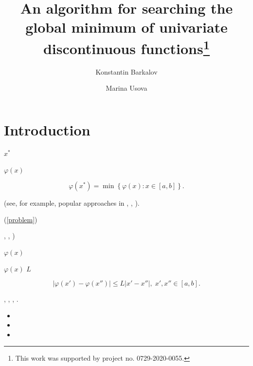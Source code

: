 \documentclass[runningheads]{llncs}
\begin{document}
%
\title{An algorithm for searching the global minimum of univariate discontinuous functions\thanks{This work was supported by project no. 0729-2020-0055.}}
%
%
\author{Konstantin Barkalov %
\and Marina Usova %
}
%
%
%
\maketitle              %
%
\begin{abstract}


\end{abstract}
%
%
%
\section{Introduction}

$x^*$

$\varphi(x)$

\begin{equation}\label{problem}
\varphi(x^*)=\min\left\{\varphi(x):x\in\left[a,b\right]\right\}.
\end{equation}

(see, for example, popular approaches in \cite{Sergeyev2013}, \cite{PaulaviciusZilinskas2014}, \cite{Sergeyev2017}).

(\ref{problem})

\cite{Horst1995}, \cite{Horst1996}, \cite{Pinter1996})

$\varphi(x)$

$\varphi(x)$  $L$

\[
\left|\varphi(x')-\varphi(x'')\right|\leq L\left|x'-x''\right|,\; x',x'' \in [a,b].
\]

\cite{Jones2009}, \cite{Evtushenko2009}, \cite{Paulavicius2011}, \cite{Evtushenko2013}. 

\begin{itemize}
  \item
  \item 
  \item
\end{itemize}
\end{document}
